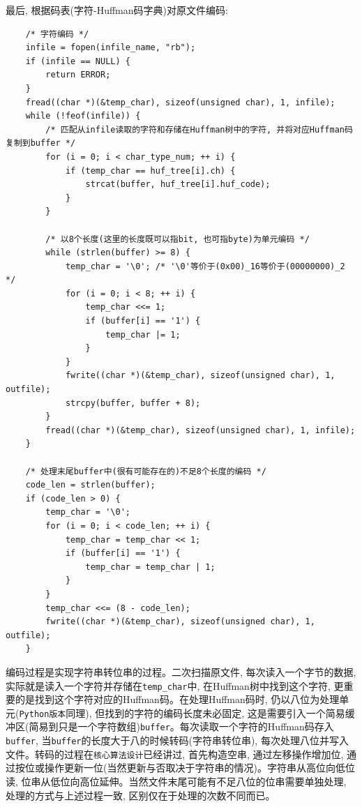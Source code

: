 \documentclass{ctexart}
\begin{document}
最后, 根据码表(字符-Huffman码字典)对原文件编码:

{\setmainfont{Courier New Bold}              
\begin{lstlisting}
    /* 字符编码 */
    infile = fopen(infile_name, "rb");
    if (infile == NULL) {
        return ERROR;
    }
    fread((char *)(&temp_char), sizeof(unsigned char), 1, infile);
    while (!feof(infile)) {
        /* 匹配从infile读取的字符和存储在Huffman树中的字符, 并将对应Huffman码复制到buffer */
        for (i = 0; i < char_type_num; ++ i) {
            if (temp_char == huf_tree[i].ch) {
                strcat(buffer, huf_tree[i].huf_code);
            }
        }

        /* 以8个长度(这里的长度既可以指bit, 也可指byte)为单元编码 */
        while (strlen(buffer) >= 8) {
            temp_char = '\0'; /* '\0'等价于(0x00)_16等价于(00000000)_2 */
            for (i = 0; i < 8; ++ i) {
                temp_char <<= 1;
                if (buffer[i] == '1') {
                    temp_char |= 1;
                }
            }
            fwrite((char *)(&temp_char), sizeof(unsigned char), 1, outfile);
            strcpy(buffer, buffer + 8);
        }
        fread((char *)(&temp_char), sizeof(unsigned char), 1, infile);
    }
        
    /* 处理末尾buffer中(很有可能存在的)不足8个长度的编码 */
    code_len = strlen(buffer);
    if (code_len > 0) {
        temp_char = '\0';
        for (i = 0; i < code_len; ++ i) {
            temp_char = temp_char << 1;
            if (buffer[i] == '1') {
                temp_char = temp_char | 1;
            }
        }
        temp_char <<= (8 - code_len);
        fwrite((char *)(&temp_char), sizeof(unsigned char), 1, outfile);
    }
\end{lstlisting}}

编码过程是实现字符串转位串的过程。二次扫描原文件, 每次读入一个字节的数据, 实际就是读入一个字符并存储在\texttt{temp\_char}中, 在Huffman树中找到这个字符, 更重要的是找到这个字符对应的Huffman码。在处理Huffman码时, 仍以八位为处理单元(\texttt{Python版本}同理), 但找到的字符的编码长度未必固定,
这是需要引入一个简易缓冲区(简易到只是一个字符数组)\texttt{buffer}。每次读取一个字符的Huffman码存入\texttt{buffer}, 当\texttt{buffer}的长度大于八的时候转码(字符串转位串), 每次处理八位并写入文件。转码的过程在\texttt{核心算法设计}已经讲过, 首先构造空串, 通过左移操作增加位, 通过按位或操作更新一位(当然更新与否取决于字符串的情况)。字符串从高位向低位读, 位串从低位向高位延伸。当然文件末尾可能有不足八位的位串需要单独处理, 处理的方式与上述过程一致, 区别仅在于处理的次数不同而已。
\end{document}
